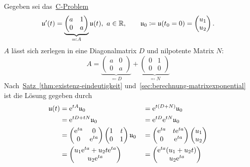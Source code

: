 \begin{example*}
    Gegeben sei das~\hyperref[eq:cp]{C-Problem}
    \begin{equation*}
        \mathfrak{u}'(t) = \underbrace{\begin{pmatrix} a & 1\\ 0 & a \end{pmatrix}}_{\eqqcolon A} \mathfrak{u}(t),\ a \in \mathbb{R},
        \qquad \mathfrak{u}_0 \coloneqq \mathfrak{u}(t_0 = 0) = \begin{pmatrix}u_1\\ u_2\end{pmatrix}.
    \end{equation*}
    $A$ lässt sich zerlegen in eine Diagonalmatrix $D$ und nilpotente Matrix $N$:
    \begin{equation*}
        A = \underbrace{\begin{pmatrix} a & 0\\ 0 & a \end{pmatrix}}_{\eqqcolon D}
            + \underbrace{\begin{pmatrix} 0 & 1\\ 0 & 0 \end{pmatrix}}_{\eqqcolon N}
    \end{equation*}
    Nach~\hyperref[thm:existenz-eindeutigkeit]{Satz~\ref*{thm:existenz-eindeutigkeit}} und~\autoref{sec:berechnung-matrixexponential} ist die Lösung gegeben durch
    \begin{alignat*}{2}
        \mathfrak{u}(t) &= \mathrm{e}^{t A} \mathfrak{u}_0
            &&= \mathrm{e}^{t (D + N)} \mathfrak{u}_0\\
        &= \mathrm{e}^{t D + t N} \mathfrak{u}_0
            &&= \mathrm{e}^{t D} \mathrm{e}^{t N} \mathfrak{u}_0\\
        &= \begin{pmatrix} \mathrm{e}^{t a} & 0\\ 0 & \mathrm{e}^{t a} \end{pmatrix} \begin{pmatrix} 1 & t\\ 0 & 1 \end{pmatrix} \mathfrak{u}_0
            &&= \begin{pmatrix} \mathrm{e}^{t a} & t \mathrm{e}^{t a}\\ 0 & \mathrm{e}^{t a} \end{pmatrix} \begin{pmatrix}u_1\\ u_2\end{pmatrix}\\
        &= \begin{pmatrix} u_1 \mathrm{e}^{t a} + u_2 t \mathrm{e}^{t a}\\ u_2 \mathrm{e}^{t a} \end{pmatrix}
            &&= \begin{pmatrix} \mathrm{e}^{t a} (u_1 + u_2 t)\\ u_2 \mathrm{e}^{t a} \end{pmatrix}
    \end{alignat*}
\end{example*}